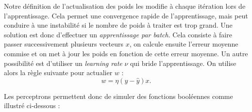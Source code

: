 \begin{remark}[Variantes]
    Notre définition de l'actualisation des poids les modifie à chaque itération lors de l'apprentissage. Cela permet une convergence rapide de l'apprentissage, mais peut conduire à une instabilité  si le nombre de poids à traiter est trop grand.  Une solution est donc d'effectuer un \emph{apprentissage par batch}. Cela consiste à faire  passer successivement plusieurs vecteurs $x$, on calcule ensuite l'erreur moyenne commise et on met à jour les poids en fonction de cette erreur moyenne. 
    Un autre possibilité est d'utiliser un \emph{learning rate} $ \nu$ qui bride l'apprentissage. On utilise alors la règle suivante pour actualier $w$ : 
        $$ w = \eta  (y - \hat{y}) x. $$
\end{remark}

Les perceptrons permettent donc de simuler des fonctions booléennes comme illustré ci-dessous : 


